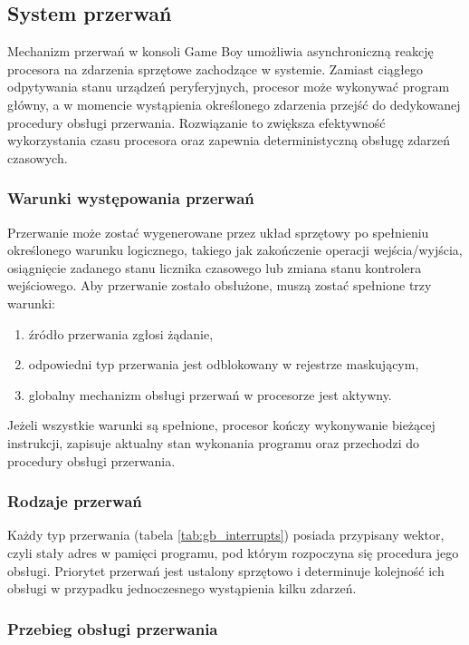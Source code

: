 \documentclass{article}
\begin{document}
\subsection{System przerwań}

Mechanizm przerwań w konsoli Game Boy umożliwia asynchroniczną reakcję procesora na zdarzenia sprzętowe zachodzące w systemie. Zamiast ciągłego odpytywania stanu urządzeń peryferyjnych, procesor może wykonywać program główny, a w momencie wystąpienia określonego zdarzenia przejść do dedykowanej procedury obsługi przerwania. Rozwiązanie to zwiększa efektywność wykorzystania czasu procesora oraz zapewnia deterministyczną obsługę zdarzeń czasowych.

\subsubsection{Warunki występowania przerwań}

Przerwanie może zostać wygenerowane przez układ sprzętowy po spełnieniu określonego warunku logicznego, takiego jak zakończenie operacji wejścia/wyjścia, osiągnięcie zadanego stanu licznika czasowego lub zmiana stanu kontrolera wejściowego. Aby przerwanie zostało obsłużone, muszą zostać spełnione trzy warunki:
\begin{enumerate}
	\item źródło przerwania zgłosi żądanie,
	\item odpowiedni typ przerwania jest odblokowany w rejestrze maskującym,
	\item globalny mechanizm obsługi przerwań w procesorze jest aktywny.
\end{enumerate}

Jeżeli wszystkie warunki są spełnione, procesor kończy wykonywanie bieżącej instrukcji, zapisuje aktualny stan wykonania programu oraz przechodzi do procedury obsługi przerwania.

\subsubsection{Rodzaje przerwań}



Każdy typ przerwania (tabela \ref{tab:gb_interrupts}) posiada przypisany wektor, czyli stały adres w pamięci programu, pod którym rozpoczyna się procedura jego obsługi. Priorytet przerwań jest ustalony sprzętowo i determinuje kolejność ich obsługi w przypadku jednoczesnego wystąpienia kilku zdarzeń.

\subsubsection{Przebieg obsługi przerwania}
\end{document}
